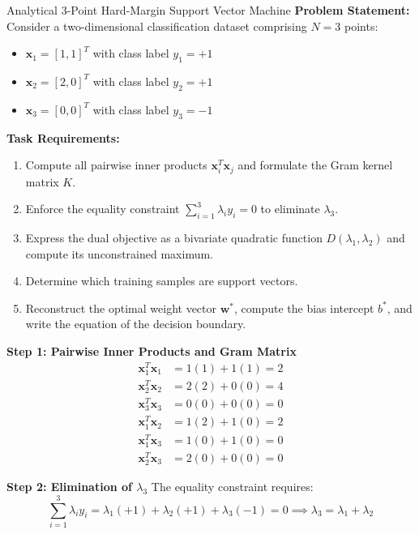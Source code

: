 \begin{examplebox}[breakable]{Analytical 3-Point Hard-Margin Support Vector Machine}
\textbf{Problem Statement:}
Consider a two-dimensional classification dataset comprising $N = 3$ points:
\begin{itemize}
    \item $\mathbf{x}_1 = [1, 1]^T$ with class label $y_1 = +1$
    \item $\mathbf{x}_2 = [2, 0]^T$ with class label $y_2 = +1$
    \item $\mathbf{x}_3 = [0, 0]^T$ with class label $y_3 = -1$
\end{itemize}

\textbf{Task Requirements:}
\begin{enumerate}
    \item Compute all pairwise inner products $\mathbf{x}_i^T \mathbf{x}_j$ and formulate the Gram kernel matrix $K$.
    \item Enforce the equality constraint $\sum_{i=1}^3 \lambda_i y_i = 0$ to eliminate $\lambda_3$.
    \item Express the dual objective as a bivariate quadratic function $D(\lambda_1, \lambda_2)$ and compute its unconstrained maximum.
    \item Determine which training samples are support vectors.
    \item Reconstruct the optimal weight vector $\mathbf{w}^*$, compute the bias intercept $b^*$, and write the equation of the decision boundary.
\end{enumerate}

\tcblower

\textbf{Step 1: Pairwise Inner Products and Gram Matrix}
\begin{align}
\mathbf{x}_1^T \mathbf{x}_1 &= 1(1) + 1(1) = 2 \\
\mathbf{x}_2^T \mathbf{x}_2 &= 2(2) + 0(0) = 4 \\
\mathbf{x}_3^T \mathbf{x}_3 &= 0(0) + 0(0) = 0 \\
\mathbf{x}_1^T \mathbf{x}_2 &= 1(2) + 1(0) = 2 \\
\mathbf{x}_1^T \mathbf{x}_3 &= 1(0) + 1(0) = 0 \\
\mathbf{x}_2^T \mathbf{x}_3 &= 2(0) + 0(0) = 0
\end{align}

\textbf{Step 2: Elimination of $\lambda_3$}
The equality constraint requires:
\begin{equation}
\sum_{i=1}^3 \lambda_i y_i = \lambda_1(+1) + \lambda_2(+1) + \lambda_3(-1) = 0 \implies \lambda_3 = \lambda_1 + \lambda_2
\end{equation}


\end{examplebox}
